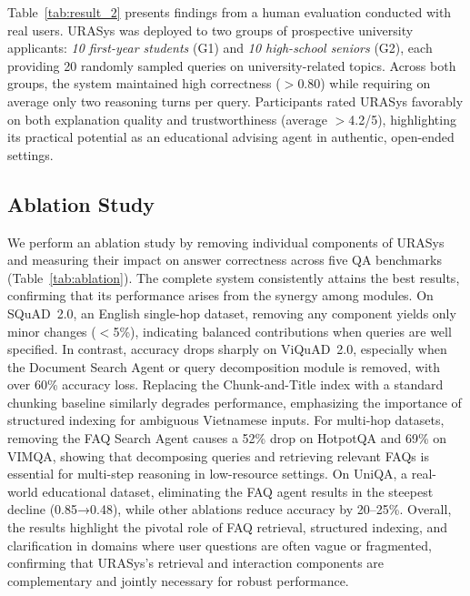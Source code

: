 \documentclass[11pt]{article}
\begin{document}
Table~\ref{tab:result_2} presents findings from a human evaluation conducted with real users. URASys was deployed to two groups of prospective university applicants: \textit{10 first-year students} (G1) and \textit{10 high-school seniors} (G2), each providing 20 randomly sampled queries on university-related topics. Across both groups, the system maintained high correctness ($>$0.80) while requiring on average only two reasoning turns per query. Participants rated URASys favorably on both explanation quality and trustworthiness (average $>$4.2/5), highlighting its practical potential as an educational advising agent in authentic, open-ended settings.



\subsection{Ablation Study}
\label{sec:ablation}

We perform an ablation study by removing individual components of URASys and measuring their impact on answer correctness across five QA benchmarks (Table~\ref{tab:ablation}). The complete system consistently attains the best results, confirming that its performance arises from the synergy among modules. On SQuAD~2.0, an English single-hop dataset, removing any component yields only minor changes ($<$5\%), indicating balanced contributions when queries are well specified. In contrast, accuracy drops sharply on ViQuAD~2.0, especially when the Document Search Agent or query decomposition module is removed, with over 60\% accuracy loss. Replacing the Chunk-and-Title index with a standard chunking baseline similarly degrades performance, emphasizing the importance of structured indexing for ambiguous Vietnamese inputs. For multi-hop datasets, removing the FAQ Search Agent causes a 52\% drop on HotpotQA and 69\% on VIMQA, showing that decomposing queries and retrieving relevant FAQs is essential for multi-step reasoning in low-resource settings. On UniQA, a real-world educational dataset, eliminating the FAQ agent results in the steepest decline (0.85→0.48), while other ablations reduce accuracy by 20–25\%. Overall, the results highlight the pivotal role of FAQ retrieval, structured indexing, and clarification in domains where user questions are often vague or fragmented, confirming that URASys's retrieval and interaction components are complementary and jointly necessary for robust performance.
\end{document}
